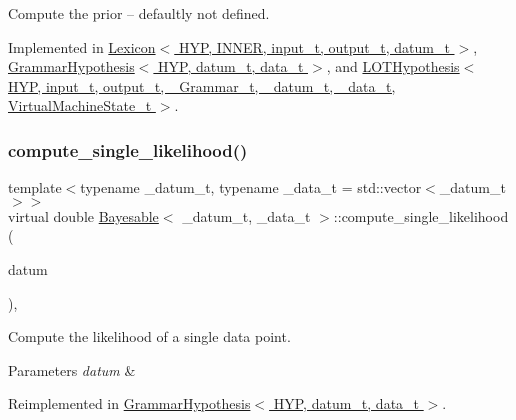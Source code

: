 Compute the prior -- defaultly not defined. 



Implemented in \hyperlink{class_lexicon_a2e099a68dd08d62897b40647f92eba1c}{Lexicon$<$ H\+Y\+P, I\+N\+N\+E\+R, input\+\_\+t, output\+\_\+t, datum\+\_\+t $>$}, \hyperlink{class_grammar_hypothesis_a36c0ec17fb79f56fb4c71ed58f2625f6}{Grammar\+Hypothesis$<$ H\+Y\+P, datum\+\_\+t, data\+\_\+t $>$}, and \hyperlink{class_l_o_t_hypothesis_af215c4833e81984364703b2e4cb78dc7}{L\+O\+T\+Hypothesis$<$ H\+Y\+P, input\+\_\+t, output\+\_\+t, \+\_\+\+Grammar\+\_\+t, \+\_\+datum\+\_\+t, \+\_\+data\+\_\+t, Virtual\+Machine\+State\+\_\+t $>$}.

\mbox{\label{class_bayesable_a87d195bfe5cdf6d293dae5fc01ae2e6c}} 
\subsubsection{\texorpdfstring{compute\+\_\+single\+\_\+likelihood()}{compute\_single\_likelihood()}}
{\footnotesize\ttfamily template$<$typename \+\_\+datum\+\_\+t, typename \+\_\+data\+\_\+t = std\+::vector$<$\+\_\+datum\+\_\+t$>$$>$ \\
virtual double \hyperlink{class_bayesable}{Bayesable}$<$ \+\_\+datum\+\_\+t, \+\_\+data\+\_\+t $>$\+::compute\+\_\+single\+\_\+likelihood (\begin{DoxyParamCaption}\item[{const \hyperlink{class_bayesable_a9f1a6c0cd7855550fa10b1a8f13a5867}{datum\+\_\+t} \&}]{datum }\end{DoxyParamCaption})\hspace{0.3cm}{\ttfamily [inline]}, {\ttfamily [virtual]}}



Compute the likelihood of a single data point. 


\begin{DoxyParams}{Parameters}
{\em datum} & \\
\hline
\end{DoxyParams}


Reimplemented in \hyperlink{class_grammar_hypothesis_ad8e5300800646a0c0af9a0f7d0b86422}{Grammar\+Hypothesis$<$ H\+Y\+P, datum\+\_\+t, data\+\_\+t $>$}.

\mbox{\label{class_bayesable_a26f6d55e7526ebd897cbb27c757b611b}} 
